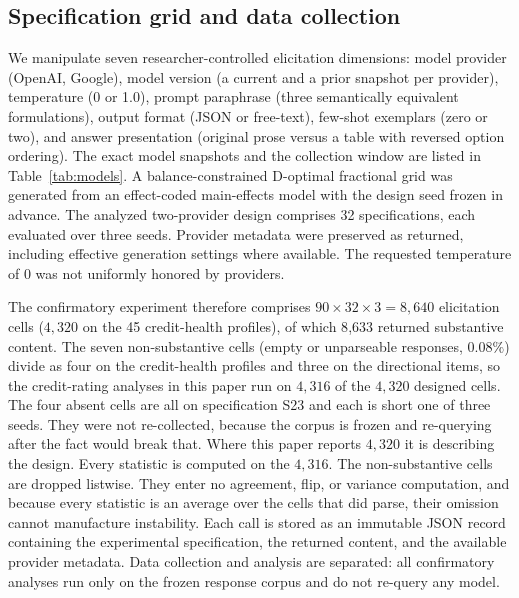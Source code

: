 \documentclass[a4paper,fleqn]{cas-sc}
\begin{document}
\subsection{Specification grid and data collection}
We manipulate seven researcher-controlled elicitation dimensions: model provider (OpenAI, Google), model
version (a current and a prior snapshot per provider), temperature (0 or 1.0), prompt paraphrase (three
semantically equivalent formulations), output format (JSON or free-text), few-shot exemplars (zero or
two), and answer presentation (original prose versus a table with reversed option ordering). The exact
model snapshots and the collection window are listed in Table~\ref{tab:models}. A balance-constrained
D-optimal fractional grid was generated from an effect-coded main-effects model with the design seed
frozen in advance. The analyzed two-provider design comprises 32 specifications, each evaluated over three seeds. Provider metadata were preserved as returned, including effective generation settings where
available. The requested temperature of 0 was not uniformly honored by providers.

The confirmatory experiment therefore comprises $90\times32\times3=8{,}640$ elicitation cells
($4{,}320$ on the 45 credit-health profiles), of which 8{,}633 returned substantive content. The seven
non-substantive cells (empty or unparseable responses, $0.08\%$) divide as four on the credit-health
profiles and three on the directional items, so the credit-rating analyses in this paper run on
$4{,}316$ of the $4{,}320$ designed cells. The four absent cells are all on specification S23 and
each is short one of three seeds. They were not re-collected, because the corpus is frozen and
re-querying after the fact would break that. Where this paper reports $4{,}320$ it is describing the
design. Every statistic is computed on the $4{,}316$. The non-substantive cells are dropped
listwise. They enter no
agreement, flip, or variance computation, and because every statistic is an average over the cells that
did parse, their omission cannot manufacture instability. Each call is stored as an immutable JSON record
containing the experimental specification, the returned content, and the available provider metadata.
Data collection and analysis are separated: all confirmatory analyses run only on the frozen response
corpus and do not re-query any model.
\end{document}
